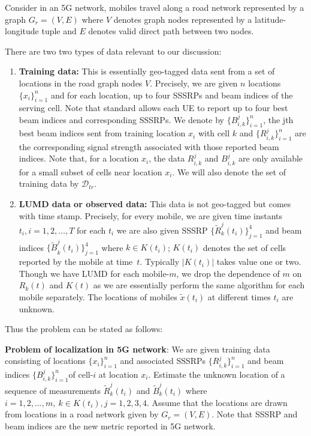 \documentclass[conference, 10pt]{IEEEtran}
\newcommand{\abs}[1]{\lvert #1 \rvert}
\newcommand{\card}[1]{\abs{#1}}
\begin{document}
Consider in an 5G network, mobiles travel along a road network represented by a graph $G_r=(V,E)$ where $V$
denotes graph nodes represented by a latitude-longitude tuple and $E$ denotes
valid direct path between two nodes.

There are two two types of data relevant to our discussion:

\begin{enumerate}

\item \textbf{Training data:} This is essentially geo-tagged data sent from
a set of locations in the road graph nodes $V$. Precisely, we are given $n$ locations
$\{x_i\}_{i=1}^n$ and for each location, up to four SSSRPs and beam indices of
the serving cell. Note that standard allows each UE to report up to four best beam indices and corresponding SSSRPs.
We denote by $\{B^{j}_{i,k}\}_{i=1}^n$, the jth best beam indices sent from training location $x_i$ with cell $k$ and $\{R^j_{i,k}\}_{i=1}^n$ are the corresponding signal strength 
associated with those reported beam indices. Note
that, for a location $x_i$, the data $R^j_{i,k}$  and $B^j_{i,k}$ are only available
for a small subset of cells near location $x_i$. We will also denote the set of
training data by $\mathcal{D}_{tr}$.

\item \textbf{LUMD data or observed data:} This data is not geo-tagged but comes
with time stamp. Precisely, for every mobile, we are given time instants
$t_i, i=1,2,\hdots,T$ for each $t_i$ we are also given SSSRP
$\{{\tilde{R}}^j_k(t_i)\}_{j=1}^4$ and beam indices ${\{\tilde{B}}^j_k(t_i)\}_{j=1}^4$ where $k\in K(t_i)$; $K(t_i)$ denotes the set of cells reported by
the mobile at time~$t$. Typically $\card{K(t_i)}$ takes value one or two.
Though we have LUMD for each mobile-$m$, we drop the dependence of $m$
on $R_k(t)$ and $K(t)$ as we are essentially perform the same algorithm
for each mobile separately. The locations of mobiles $\tilde{x}(t_i)$ at different
times $t_i$ are unknown.
	
\end{enumerate} 

Thus the problem can be stated as follows:

 {\bf Problem of localization in 5G network}: We are given training data consisting
of locations $\{x_i\}_{i=1}^n$ and associated SSSRPs  $\{R^j_{i,k}\}_{i=1}^n$ and beam indices $\{B^j_{i,k}\}_{i=1}^n$of
cell-$i$ at location $x_i$. Estimate the unknown location of a sequence of measurements
${\tilde{R}}^j_k(t_i)$ and ${\tilde{B}}^j_k(t_i)$ where $i=1,2,\hdots,m,\ k\in K(t_i), j=1, 2, 3, 4$. Assume that the locations
are drawn from locations in a road network given by $G_r=(V,E)$. Note that SSSRP and beam indices are the new metric reported
in 5G network.
\end{document}
